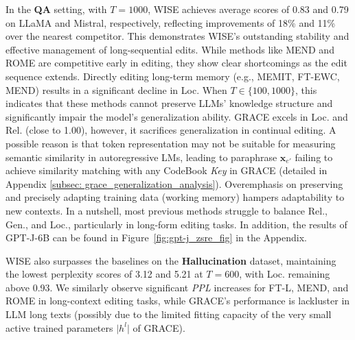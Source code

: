 
In the \textbf{QA} setting, with $T=1000$, WISE achieves average scores of 0.83 and 0.79 on LLaMA and Mistral, respectively, reflecting improvements of 18\% and 11\% over the nearest competitor.
This demonstrates WISE's outstanding stability and effective management of long-sequential edits. 
While methods like MEND and ROME are competitive early in editing, they show clear shortcomings as the edit sequence extends.
Directly editing long-term memory (e.g., MEMIT, FT-EWC, MEND) results in a significant decline in Loc. When $T \in \{100, 1000\}$, this indicates that these methods cannot preserve LLMs' knowledge structure and significantly impair the model's generalization ability. 
GRACE excels in Loc. and Rel. (close to 1.00), however, it sacrifices generalization in continual editing.
A possible reason is that token representation may not be suitable for measuring semantic similarity in autoregressive LMs, leading to paraphrase $\mathbf{x}_{e'}$ failing to achieve similarity matching with any CodeBook \textit{Key} in GRACE (detailed in Appendix \ref{subsec: grace_generalization_analysis}).
Overemphasis on preserving and precisely adapting training data (working memory) hampers adaptability to new contexts.
In a nutshell, most previous methods struggle to balance Rel., Gen., and Loc., particularly in long-form editing tasks. In addition, the results of GPT-J-6B can be found in Figure~\ref{fig:gpt-j_zsre_fig} in the Appendix.

WISE also surpasses the baselines on the \textbf{Hallucination} dataset, maintaining the lowest perplexity scores of 3.12 and 5.21 at $T=600$, with Loc. remaining above 0.93. We similarly observe significant \textit{PPL} increases for FT-L, MEND, and ROME in long-context editing tasks, while GRACE's performance is lackluster in LLM long texts (possibly due to the limited fitting capacity of the very small active trained parameters $\vert h^l \vert$ of GRACE).

